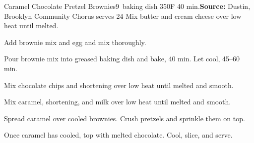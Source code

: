 \begin{recipe}{Caramel Chocolate Pretzel Brownies}{9\inch{}\inch\ baking dish \hfill 350\0F \hfill 40 min.}{\textbf{Source:} Dustin, Brooklyn Community Chorus \hfill serves 24}
 Mix butter and cream cheese over low heat until melted.

 Add brownie mix and egg and mix thoroughly.

 \newstep Pour brownie mix into greased baking dish and bake, 40 min. Let cool, 45--60 min.

 Mix chocolate chips and shortening over low heat until melted and smooth.

 Mix caramel, shortening, and milk over low heat until melted and smooth.

 Spread caramel over cooled brownies. Crush pretzels and sprinkle them on top.

 \newstep Once caramel has cooled, top with melted chocolate. Cool, slice, and serve.

\end{recipe}
